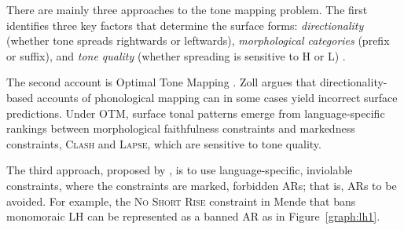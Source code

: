 \documentclass{CUP-JNL-PHO}%
\theoremstyle{definition}
\numberwithin{equation}{section}
\theoremstyle{definition}
\begin{document}
There are mainly three approaches to the tone mapping problem. The
first identifies three key factors that determine the surface forms:
\textit{directionality} (whether tone spreads rightwards or leftwards), \textit{morphological categories }(prefix or suffix), and \textit{tone quality}
(whether spreading is sensitive to H or L) \citep{hyman1987prosodic,
	leben2017tone, hyman2009representation}.

The second account is Optimal Tone Mapping \citep[OTM;][]
{zoll2003optimal}. Zoll argues that directionality-based accounts of
phonological mapping can in some cases yield incorrect surface
predictions. Under OTM, surface tonal patterns emerge from
language-specific rankings between morphological faithfulness
constraints and markedness constraints, \textsc{Clash} and
\textsc{Lapse}, which are sensitive to tone quality.

The third approach, proposed by \citet{jardine2017LocalNature}, 
is to use language-specific, inviolable constraints, where the
constraints are marked, forbidden ARs; that is, ARs to be
avoided. For example, the \textsc{No Short Rise} constraint in Mende
\citep{leben2017tone} that bans monomoraic LH can be represented as a
banned AR as in Figure~\ref{graph:lh1}.
\end{document}
